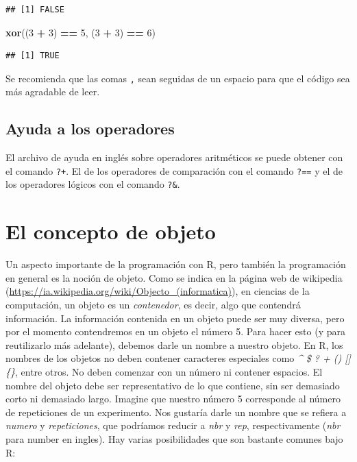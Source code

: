 \documentclass[]{book}
\makeatletter
\newenvironment{Shaded}{\begin{snugshade}}{\end{snugshade}}
\newcommand{\KeywordTok}[1]{\textcolor[rgb]{0.13,0.29,0.53}{\textbf{#1}}}
\newcommand{\DecValTok}[1]{\textcolor[rgb]{0.00,0.00,0.81}{#1}}
\newcommand{\StringTok}[1]{\textcolor[rgb]{0.31,0.60,0.02}{#1}}
\newcommand{\OperatorTok}[1]{\textcolor[rgb]{0.81,0.36,0.00}{\textbf{#1}}}
\newcommand{\NormalTok}[1]{#1}
\newenvironment{kframe}{%
\medskip{}
\setlength{\fboxsep}{.8em}
 \def\at@end@of@kframe{}%
 \ifinner\ifhmode%
  \def\at@end@of@kframe{\end{minipage}}%
  \begin{minipage}{\columnwidth}%
 \fi\fi%
 \def\FrameCommand##1{\hskip\@totalleftmargin \hskip-\fboxsep
 \colorbox{shadecolor}{##1}\hskip-\fboxsep
     \hskip-\linewidth \hskip-\@totalleftmargin \hskip\columnwidth}%
 \MakeFramed {\advance\hsize-\width
   \@totalleftmargin\z@ \linewidth\hsize
   \@setminipage}}%
 {\par\unskip\endMakeFramed%
 \at@end@of@kframe}
\newenvironment{rmdblock}[1]
  {
  \begin{itemize}
  \renewcommand{\labelitemi}{
    \raisebox{-.7\height}[0pt][0pt]{
      {\setkeys{Gin}{width=3em,keepaspectratio}\texttt{[image: myIcons/\#1]}} %
    }
  }
  \setlength{\fboxsep}{1em}
  \begin{kframe}
  \item
  }
  {
  \end{kframe}
  \end{itemize}
  }
\newenvironment{rmdstyle}     %
  {\begin{rmdblock}{style}}   %
  {\end{rmdblock}}            %
\makeatother
\begin{document}
\begin{verbatim}
## [1] FALSE
\end{verbatim}

\begin{Shaded}
\begin{Highlighting}[]
\KeywordTok{xor}\NormalTok{((}\DecValTok{3} \OperatorTok{+}\StringTok{ }\DecValTok{3}\NormalTok{) }\OperatorTok{==}\StringTok{ }\DecValTok{5}\NormalTok{, (}\DecValTok{3} \OperatorTok{+}\StringTok{ }\DecValTok{3}\NormalTok{) }\OperatorTok{==}\StringTok{ }\DecValTok{6}\NormalTok{)}
\end{Highlighting}
\end{Shaded}

\begin{verbatim}
## [1] TRUE
\end{verbatim}

\begin{rmdstyle}
Se recomienda que las comas \texttt{,} sean seguidas de un espacio para
que el código sea más agradable de leer.
\end{rmdstyle}

\subsection{Ayuda a los operadores}\label{ayuda-a-los-operadores}

El archivo de ayuda en inglés sobre operadores aritméticos se puede
obtener con el comando \texttt{?\textquotesingle{}+\textquotesingle{}}.
El de los operadores de comparación con el comando
\texttt{?\textquotesingle{}==\textquotesingle{}} y el de los operadores
lógicos con el comando \texttt{?\textquotesingle{}\&\textquotesingle{}}.

\section{El concepto de objeto}\label{el-concepto-de-objeto}

Un aspecto importante de la programación con R, pero también la
programación en general es la noción de objeto. Como se indica en la
página web de wikipedia
(\url{https://ia.wikipedia.org/wiki/Objecto_(informatica)}), en ciencias
de la computación, un objeto es un \emph{contenedor}, es decir, algo que
contendrá información. La información contenida en un objeto puede ser
muy diversa, pero por el momento contendremos en un objeto el número 5.
Para hacer esto (y para reutilizarlo más adelante), debemos darle un
nombre a nuestro objeto. En R, los nombres de los objetos no deben
contener caracteres especiales como \emph{\^{} \$ ? \textbar{} + ()
{[}{]} \{\}}, entre otros. No deben comenzar con un número ni contener
espacios. El nombre del objeto debe ser representativo de lo que
contiene, sin ser demasiado corto ni demasiado largo. Imagine que
nuestro número 5 corresponde al número de repeticiones de un
experimento. Nos gustaría darle un nombre que se refiera a \emph{numero}
y \emph{repeticiones}, que podríamos reducir a \emph{nbr} y \emph{rep},
respectivamente (\emph{nbr} para number en ingles). Hay varias
posibilidades que son bastante comunes bajo R:
\end{document}
